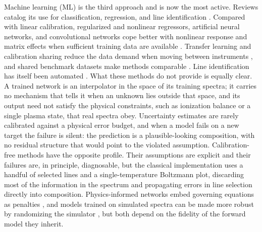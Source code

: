Machine learning (ML) is the third approach and is now the most active.
Reviews catalog its use for classification, regression, and line identification \citep{hao2024mlreview,dehbozorgi2025mldl,zhang2023dlreview}.
Compared with linear calibration, regularized and nonlinear regressors, artificial neural networks, and convolutional networks cope better with nonlinear response and matrix effects when sufficient training data are available \citep{sirven2006ann,li2020cnn}.
Transfer learning and calibration sharing reduce the data demand when moving between instruments \citep{kepes2022transfer,lepore2024calsharing}, and shared benchmark datasets make methods comparable \citep{kepes2020benchmark}.
Line identification has itself been automated \citep{noel2025alias}.
What these methods do not provide is equally clear.
A trained network is an interpolator in the space of its training spectra; it carries no mechanism that tells it when an unknown lies outside that space, and its output need not satisfy the physical constraints, such as ionization balance or a single plasma state, that real spectra obey.
Uncertainty estimates are rarely calibrated against a physical error budget, and when a model fails on a new target the failure is silent: the prediction is a plausible-looking composition, with no residual structure that would point to the violated assumption.
Calibration-free methods have the opposite profile.
Their assumptions are explicit and their failures are, in principle, diagnosable, but the classical implementation uses a handful of selected lines and a single-temperature Boltzmann plot, discarding most of the information in the spectrum and propagating errors in line selection directly into composition.
Physics-informed networks embed governing equations as penalties \citep{raissi2019pinn}, and models trained on simulated spectra can be made more robust by randomizing the simulator \citep{tobin2017domainrand}, but both depend on the fidelity of the forward model they inherit.

